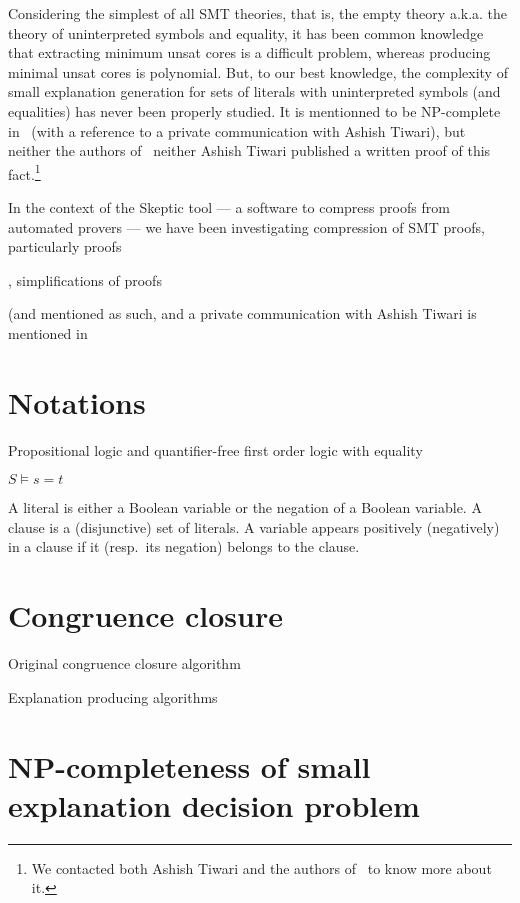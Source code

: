 \documentclass{easychair}
\begin{document}
Considering the simplest of all SMT theories, that is, the empty theory
a.k.a. the theory of uninterpreted symbols and equality, it has been common
knowledge that extracting minimum unsat cores is a difficult problem, whereas
producing minimal unsat cores is polynomial.  But, to our best knowledge, the
complexity of small explanation generation for sets of literals with
uninterpreted symbols (and equalities) has never been properly studied.  It is
mentionned to be NP-complete in~\cite{Nieuwenhuis8} (with a reference to a
private communication with Ashish Tiwari), but neither the authors
of~\cite{Nieuwenhuis8} neither Ashish Tiwari published a written proof of this
fact.\footnote{We contacted both Ashish Tiwari and the authors
  of~\cite{Nieuwenhuis8} to know more about it.}


In the context of the Skeptic tool --- a software to compress proofs from
automated provers --- we have been investigating compression of SMT proofs,
particularly proofs 


, simplifications of proofs


 (and mentioned as such, and a private communication with Ashish Tiwari is mentioned
in~\cite{Nieuwenhuis8}

\section*{Notations}

Propositional logic and quantifier-free first order logic with equality

$S \models s=t$

A literal is either a Boolean variable or the negation of a Boolean variable.
A clause is a (disjunctive) set of literals.  A variable appears positively (negatively) in a clause if it (resp.\ its negation) belongs to the clause.

\section*{Congruence closure}

Original congruence closure algorithm~\cite{}

Explanation producing algorithms~\cite{}


\section*{NP-completeness of small explanation decision problem}
\label{sec:npcomplete}
\end{document}

